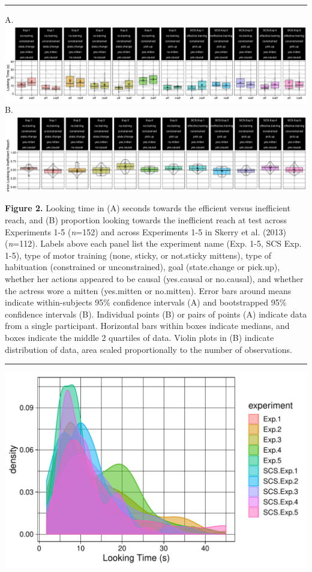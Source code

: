 \documentclass[]{article}
\begin{document}
\begin{center}\rule{0.5\linewidth}{\linethickness}\end{center}

A. \includegraphics{lumi_analysis_files/figure-latex/fig2a-1.pdf} B.
\includegraphics{lumi_analysis_files/figure-latex/fig2b-1.pdf}

\textbf{Figure 2.} Looking time in (A) seconds towards the efficient
versus inefficient reach, and (B) proportion looking towards the
inefficient reach at test across Experiments 1-5 (\emph{n}=152) and
across Experiments 1-5 in Skerry et al. (2013) (\emph{n}=112). Labels
above each panel list the experiment name (Exp. 1-5, SCS Exp. 1-5), type
of motor training (none, sticky, or not.sticky mittens), type of
habituation (constrained or unconstrained), goal (state.change or
pick.up), whether her actions appeared to be causal (yes.causal or
no.causal), and whether the actress wore a mitten (yes.mitten or
no.mitten). Error bars around means indicate within-subjects 95\%
confidence intervals (A) and bootstrapped 95\% confidence intervals (B).
Individual points (B) or pairs of points (A) indicate data from a single
participant. Horizontal bars within boxes indicate medians, and boxes
indicate the middle 2 quartiles of data. Violin plots in (B) indicate
distribution of data, area scaled proportionally to the number of
observations.

\begin{center}\rule{0.5\linewidth}{\linethickness}\end{center}

\includegraphics{lumi_analysis_files/figure-latex/figS1-1.pdf}
\end{document}
